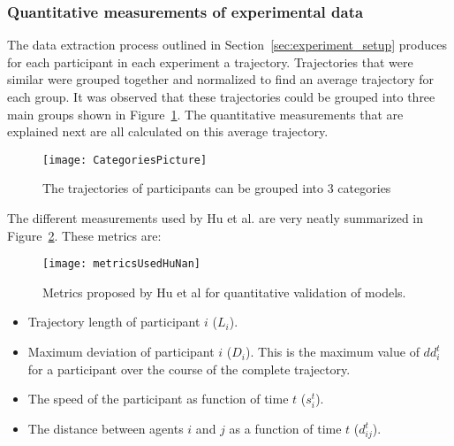 \subsubsection{Quantitative measurements of experimental data} %
\label{sec:metrics_used}

The data extraction process outlined in Section~\ref{sec:experiment_setup} produces for each participant in each experiment a trajectory. Trajectories that were similar were grouped together and normalized to find an average trajectory for each group. It was observed that these trajectories could be grouped into three main groups shown in Figure~\ref{fig:categoriesOfMotion}.  The quantitative measurements that are explained next are all calculated on this average trajectory.

\begin{figure}[!tbph]
    \begin{center}
        \texttt{[image: CategoriesPicture]}
    \end{center}
    \caption{The trajectories of participants can be grouped into 3 categories}
    \label{fig:categoriesOfMotion}
\end{figure}

The different measurements used by Hu et al. are very neatly summarized in Figure~\ref{fig:OverviewOfMetrics}. These metrics are:

\begin{figure}[!tbph]
    \begin{center}
        \texttt{[image: metricsUsedHuNan]}
    \end{center}
    \caption{Metrics proposed by Hu et al for quantitative validation of models.}
    \label{fig:OverviewOfMetrics}
\end{figure}

\begin{itemize}
    \item Trajectory length of participant $i$ ($L_i$).
    \item Maximum deviation of participant $i$ ($D_i$). This is the maximum value of $dd^t_i$ for a participant over the course of the complete trajectory.
    \item The speed of the participant as function of time $t$ ($s^t_i$).
    \item The distance between agents $i$ and $j$ as a function of time $t$ ($d^t_{ij}$).
\end{itemize}

